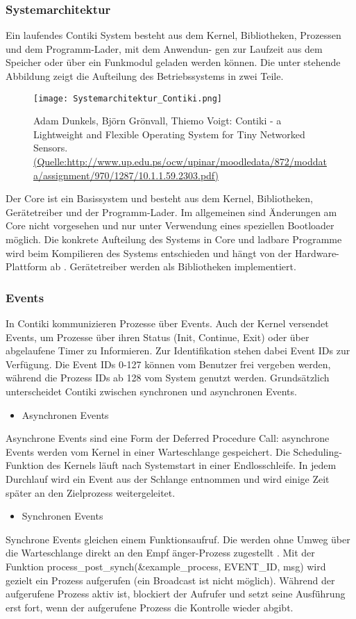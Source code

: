 \subsubsection{Systemarchitektur}
Ein laufendes Contiki System besteht aus dem Kernel, Bibliotheken, Prozessen und dem Programm-Lader, mit dem Anwendun-
gen zur Laufzeit aus dem Speicher oder \"uber ein Funkmodul geladen werden k\"onnen. Die unter stehende Abbildung zeigt die Aufteilung des Betriebssystems in zwei Teile. 
\begin{figure}[h!]
	\centering
		\texttt{[image: Systemarchitektur\_Contiki.png]}
	\caption{Adam Dunkels, Bj\"orn Gr\"onvall, Thiemo Voigt: Contiki - a Lightweight and Flexible Operating System for Tiny Networked Sensors. \url{(Quelle:http://www.up.edu.ps/ocw/upinar/moodledata/872/moddata/assignment/970/1287/10.1.1.59.2303.pdf)}}
	\label{Systemarchitektur von Contiki}
\end{figure}
Der Core ist ein Basissystem und besteht aus dem Kernel, Bibliotheken, Ger\"{a}tetreiber und der Programm-Lader. Im allgemeinen sind \"Anderungen am Core nicht vorgesehen und nur unter Verwendung eines speziellen Bootloader m\"oglich. Die konkrete Aufteilung des Systems in Core und ladbare Programme wird beim Kompilieren des Systems entschieden und h\"angt von der Hardware-Plattform ab \cite[S. 7]{Walter:2010}. Ger\"atetreiber werden als Bibliotheken implementiert. 

\subsubsection{Events}
In Contiki kommunizieren Prozesse \"uber Events. Auch der Kernel versendet Events, um Prozesse \"uber ihren Status (Init, Continue, Exit) oder \"uber abgelaufene Timer zu Informieren. Zur Identifikation stehen dabei Event IDs zur Verf\"ugung. Die Event IDs 0-127 k\"onnen vom Benutzer frei vergeben werden, w\"ahrend die Prozess IDs ab 128 vom System genutzt werden. Grunds\"atzlich unterscheidet Contiki zwischen synchronen und asynchronen Events. 
\begin{itemize}
\item Asynchronen Events
\end{itemize}
Asynchrone Events sind eine Form der Deferred Procedure Call: asynchrone Events werden vom Kernel in einer Warteschlange gespeichert. Die Scheduling-Funktion des Kernels l\"auft nach Systemstart in einer Endlosschleife. In jedem Durchlauf wird ein Event aus der Schlange entnommen und wird einige Zeit sp\"ater an den Zielprozess weitergeleitet.
\begin{itemize}
\item Synchronen Events
\end{itemize}
Synchrone Events gleichen einem Funktionsaufruf. Die werden ohne Umweg \"uber die Warteschlange direkt an den Empf
\"anger-Prozess zugestellt \cite[S. 7]{Walter:2010}.  Mit der Funktion process\_post\_synch(\&example\_process, EVENT\_ID, msg) wird gezielt ein Prozess aufgerufen (ein Broadcast ist nicht m\"oglich). W\"ahrend der aufgerufene Prozess aktiv ist, blockiert der Aufrufer und setzt seine Ausf\"\"{u}hrung erst fort, wenn der aufgerufene Prozess die Kontrolle wieder abgibt.

